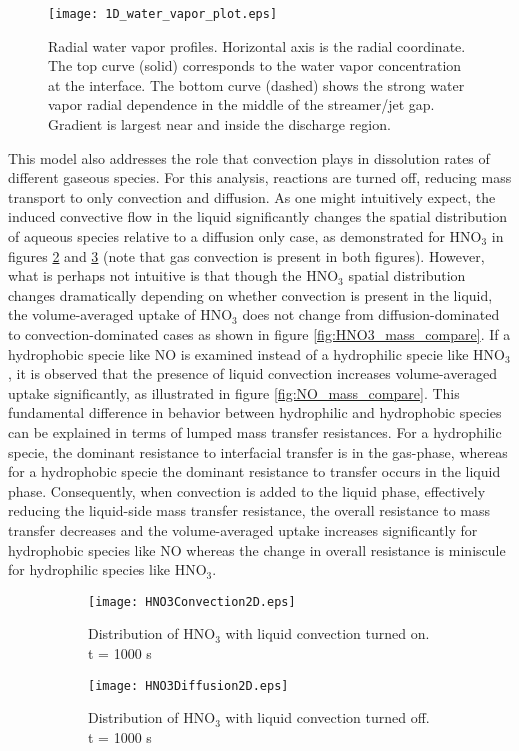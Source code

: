 \begin{figure}[htb]
    \centering
        \texttt{[image: 1D\_water\_vapor\_plot.eps]}
        \caption{Radial water vapor profiles. Horizontal axis is the radial coordinate. The top curve (solid) corresponds to the water vapor concentration at the interface. The bottom curve (dashed) shows the strong water vapor radial dependence in the middle of the streamer/jet gap. Gradient is largest near and inside the discharge region.}
        \label{fig:water_1D_profile}
\end{figure}

This model also addresses the role that convection plays in dissolution rates of different gaseous species. For this analysis, reactions are turned off, reducing mass transport to only convection and diffusion. As one might intuitively expect, the induced convective flow in the liquid significantly changes the spatial distribution of aqueous species relative to a diffusion only case, as demonstrated for HNO$_3$ in figures \ref{fig:HNO3_convec} and \ref{fig:HNO3_diffus} (note that gas convection is present in both figures). However, what is perhaps not intuitive is that though the HNO$_3$ spatial distribution changes dramatically depending on whether convection is present in the liquid, the volume-averaged uptake of HNO$_3$ does not change from diffusion-dominated to convection-dominated cases as shown in figure \ref{fig:HNO3_mass_compare}. If a hydrophobic specie like NO is examined instead of a hydrophilic specie like HNO$_3$, it is observed that the presence of liquid convection increases volume-averaged uptake significantly, as illustrated in figure \ref{fig:NO_mass_compare}. This fundamental difference in behavior between hydrophilic and hydrophobic species can be explained in terms of lumped mass transfer resistances. For a hydrophilic specie, the dominant resistance to interfacial transfer is in the gas-phase, whereas for a hydrophobic specie the dominant resistance to transfer occurs in the liquid phase. \cite[p. 249]{carberry2001chemical} Consequently, when convection is added to the liquid phase, effectively reducing the liquid-side mass transfer resistance, the overall resistance to mass transfer decreases and the volume-averaged uptake increases significantly for hydrophobic species like NO whereas the change in overall resistance is miniscule for hydrophilic species like HNO$_3$.

\begin{figure}[htpb]
    \centering
    \begin{subfigure}[b]{.7\textwidth}
        \texttt{[image: HNO3Convection2D.eps]}
        \caption{Distribution of HNO$_3$ with liquid convection turned on. t = 1000 s}
        \label{fig:HNO3_convec}
    \end{subfigure}
    \begin{subfigure}[b]{.7\textwidth}
        \texttt{[image: HNO3Diffusion2D.eps]}
        \caption{Distribution of HNO$_3$ with liquid convection turned off. t = 1000 s}
        \label{fig:HNO3_diffus}
    \end{subfigure}
    \caption{}
    \label{fig:HNO3}
\end{figure}

